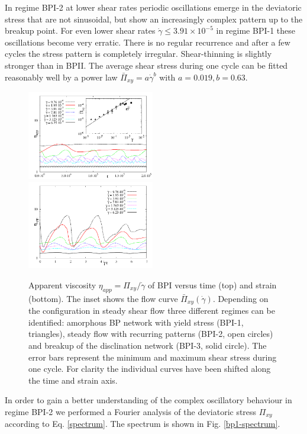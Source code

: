 \documentclass[aps,pre,reprint,superscriptaddress, twocolumn]{revtex4}
\newcommand{\e}[1]{\times10^{#1}}
\newcommand{\gd}{\dot{\gamma}}
\begin{document}
In regime BPI-2 at lower shear rates periodic oscillations emerge in the 
deviatoric stress that are not sinusoidal, but show an increasingly complex
pattern up to the breakup point.
For even lower shear rates $\gd\le3.91\e{-5}$ in regime BPI-1 
these oscillations become very erratic. There is no regular recurrence and 
after a few cycles the stress pattern is completely irregular. 
Shear-thinning is slightly stronger than in BPII. 
The average shear stress during one cycle can be fitted reasonably 
well by a power law $\bar{\Pi}_{xy}=a \gd^b$ with $a=0.019, b=0.63$.

\begin{figure}[htpb]
\includegraphics[width=0.495\textwidth]{stress_bp1.pdf}
\includegraphics[width=0.495\textwidth]{stress_vs_strain_bp1.pdf}
\caption{Apparent viscosity $\eta_{app}=\Pi_{xy}/\dot{\gamma}$ of BPI versus time (top) 
and strain (bottom). The inset shows the flow curve $\bar{\Pi}_{xy}(\gd)$. 
Depending on the configuration in steady shear flow three different regimes 
can be identified: amorphous BP network with yield stress (BPI-1, triangles), 
steady flow with recurring patterns (BPI-2, open circles) and 
breakup of the disclination network (BPI-3, solid circle). 
The error bars represent the minimum and maximum shear stress 
during one cycle. For clarity the individual curves have been shifted along
the time and strain axis.}
\label{bp1-rheo}
\end{figure}

In order to gain a better understanding of the complex oscillatory behaviour in regime BPI-2 
we performed a Fourier analysis of the deviatoric stress $\Pi_{xy}$ according to Eq. \ref{spectrum}. 
The spectrum is shown in Fig. \ref{bp1-spectrum}. 
\end{document}
